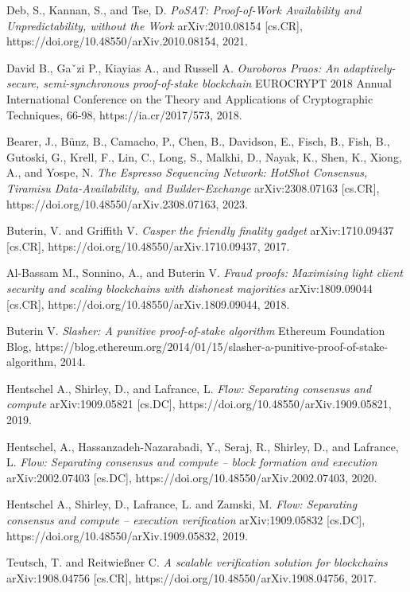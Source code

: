 \documentclass[conference]{IEEEtran}
\begin{document}
\begin{thebibliography}{}
Deb, S., Kannan, S., and Tse, D. \emph{PoSAT: Proof-of-Work Availability and Unpredictability, without the Work} arXiv:2010.08154 [cs.CR], https://doi.org/10.48550/arXiv.2010.08154, 2021.

David B., Gaˇzi P., Kiayias A., and Russell A. \emph{Ouroboros Praos: An adaptively-secure, semi-synchronous proof-of-stake blockchain} EUROCRYPT 2018 Annual International Conference on the Theory and Applications of Cryptographic Techniques, 66-98, https://ia.cr/2017/573, 2018.

Bearer, J., Bünz, B., Camacho, P., Chen, B., Davidson, E., Fisch, B., Fish, B., Gutoski, G., Krell, F., Lin, C., Long, S., Malkhi, D., Nayak, K., Shen, K., Xiong, A., and Yospe, N. \emph{The Espresso Sequencing Network: HotShot Consensus, Tiramisu Data-Availability, and Builder-Exchange} arXiv:2308.07163 [cs.CR], https://doi.org/10.48550/arXiv.2308.07163, 2023.

Buterin, V. and Griffith V. \emph{Casper the friendly finality gadget} arXiv:1710.09437 [cs.CR], https://doi.org/10.48550/arXiv.1710.09437, 2017.

Al-Bassam M., Sonnino, A., and Buterin V. \emph{Fraud proofs: Maximising light client security and scaling blockchains with dishonest majorities} arXiv:1809.09044 [cs.CR], https://doi.org/10.48550/arXiv.1809.09044, 2018.

Buterin V. \emph{Slasher: A punitive proof-of-stake algorithm} Ethereum Foundation Blog, https://blog.ethereum.org/2014/01/15/slasher-a-punitive-proof-of-stake-algorithm, 2014.

Hentschel A., Shirley, D., and Lafrance, L. \emph{Flow: Separating consensus and compute} arXiv:1909.05821 [cs.DC], https://doi.org/10.48550/arXiv.1909.05821, 2019.

Hentschel, A., Hassanzadeh-Nazarabadi, Y., Seraj, R., Shirley, D., and Lafrance, L. \emph{Flow: Separating consensus and compute – block formation and execution} arXiv:2002.07403 [cs.DC], https://doi.org/10.48550/arXiv.2002.07403, 2020.

Hentschel A., Shirley, D., Lafrance, L. and Zamski, M. \emph{Flow: Separating consensus and compute – execution verification} arXiv:1909.05832 [cs.DC], https://doi.org/10.48550/arXiv.1909.05832, 2019.

Teutsch, T. and Reitwießner C. \emph{A scalable verification solution for blockchains} arXiv:1908.04756 [cs.CR], https://doi.org/10.48550/arXiv.1908.04756, 2017.


\end{thebibliography}
\end{document}
